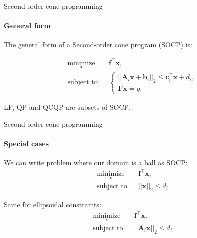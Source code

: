 \documentclass{beamer}
\begin{document}
\begin{frame}{Second-order cone programming}
\framesubtitle{General form}
\begin{flushleft}


The general form of a Second-order cone program (SOCP) is:

%
\begin{equation}
\begin{aligned}
& \underset{\mathbf{x}}{\text{minimize}}
& & \mathbf{f}^\top\mathbf{x}, \\
& \text{subject to}
& & \begin{cases}
    ||\mathbf{A}_i\mathbf{x} + \mathbf{b}_i||_2 \leq 
     \mathbf{c}_i^\top \mathbf{x} + d_i, \\
    \mathbf{F}\mathbf{x} = g.
    \end{cases}
\end{aligned}
\end{equation}

LP, QP and QCQP are subsets of SOCP.
 
\end{flushleft}
\end{frame}



\begin{frame}{Second-order cone programming}
\framesubtitle{Special cases}
\begin{flushleft}

We can write problem where our domain is a ball as SOCP:
%
\begin{equation}
\begin{aligned}
& \underset{\mathbf{x}}{\text{minimize}}
& & \mathbf{f}^\top\mathbf{x}, \\
& \text{subject to}
& & ||\mathbf{x}||_2 \leq d_i
\end{aligned}
\end{equation}

\bigskip

Same for ellipsoidal constraints:
%
\begin{equation}
\begin{aligned}
& \underset{\mathbf{x}}{\text{minimize}}
& & \mathbf{f}^\top\mathbf{x}, \\
& \text{subject to}
& & ||\mathbf{A}_i\mathbf{x}||_2 \leq d_i
\end{aligned}
\end{equation}
 
\end{flushleft}
\end{frame}
\end{document}
